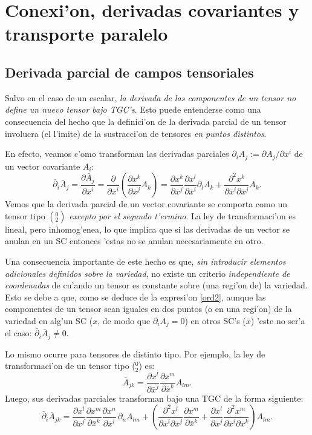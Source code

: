 \section{Conexi'on, derivadas covariantes y transporte paralelo}

\subsection{Derivada parcial de campos tensoriales}

Salvo en el caso de un escalar, \textit{la derivada de las componentes de un tensor no define un nuevo tensor bajo TGC's}. Esto puede entenderse como una consecuencia del hecho que la definici'on de la derivada parcial de un tensor involucra (el l'imite) de la sustracci'on de tensores \textit{en puntos distintos}.

En efecto, veamos c'omo transforman las derivadas parciales $\partial_i
A_j:={\partial A_j}/{\partial x^i}$ de un vector covariante $A_i$:
\begin{equation}
\bar{\partial}_i\bar{A}_j=\frac{\partial \bar{A}_j}{\partial
\bar{x}^i}=\frac{\partial }{\partial \bar{x}^i}\left(\frac{\partial x^k
}{\partial\bar{x}^j }A_k \right)
=\frac{\partial x^k }{\partial\bar{x}^j }\frac{\partial x^l }{\partial\bar{x}^i}
\partial_l A_k +\frac{\partial^2 x^k }{\partial\bar
{x}^i \partial\bar{x}^j }A_k . \label{ord2}
\end{equation}
Vemos que la derivada parcial de un vector covariante se comporta como un tensor tipo $(_2^0)$ \textit{excepto por el segundo t'ermino}. La ley de
transformaci'on es lineal, pero inhomog'enea, lo que implica que si las
derivadas de un vector se anulan en un SC entonces 'estas no se anulan
necesariamente en otro.

Una consecuencia importante de este hecho es que, \textit{sin introducir elementos adicionales definidos sobre la variedad}, no existe un criterio \textit{independiente de coordenadas} de cu'ando un tensor es constante sobre (una regi'on de) la variedad. Esto se debe a que, como se deduce de la expresi'on \eqref{ord2}, aunque las componentes de un tensor sean iguales en dos puntos (o en una regi'on) de la variedad en alg'un SC ($x$, de modo que $\partial_iA_j=0$) en otros SC's ($\bar{x}$) 'este no ser'a el caso: $\bar{\partial}_i\bar{A}_j\neq 0$.
 
Lo mismo ocurre para tensores de distinto tipo. Por ejemplo, la ley de transformaci'on de un tensor tipo ($_2^0$) es:
\begin{equation}
\bar{A}_{jk}=\frac{\partial x^l}{\partial\bar{x}^j} \frac{\partial x^m}{\partial\bar{x}^k}A_{lm}. \label{ord3}
\end{equation}
Luego, sus derivadas parciales transforman bajo una TGC de la forma siguiente:
\begin{equation}
\bar{\partial}_i\bar{A}_{jk}=\frac{\partial x^l}{\partial\bar{x}^j} 
\frac{\partial x^m}{\partial\bar{x}^k} \frac{\partial x^n}{\partial \bar{x}^i}\,\partial_nA_{lm}+\left(
\frac{\partial^2 x^l}{\partial\bar{x}^i\partial\bar{x}^j} \frac{\partial x^m}{\partial\bar{x}^k} 
+\frac{\partial x^l}{\partial\bar{x}^j}\frac{\partial^2 x^m}{\partial\bar{x}^i\partial\bar{x}^k}\right) A_{lm}. \label{ord4}
\end{equation}


